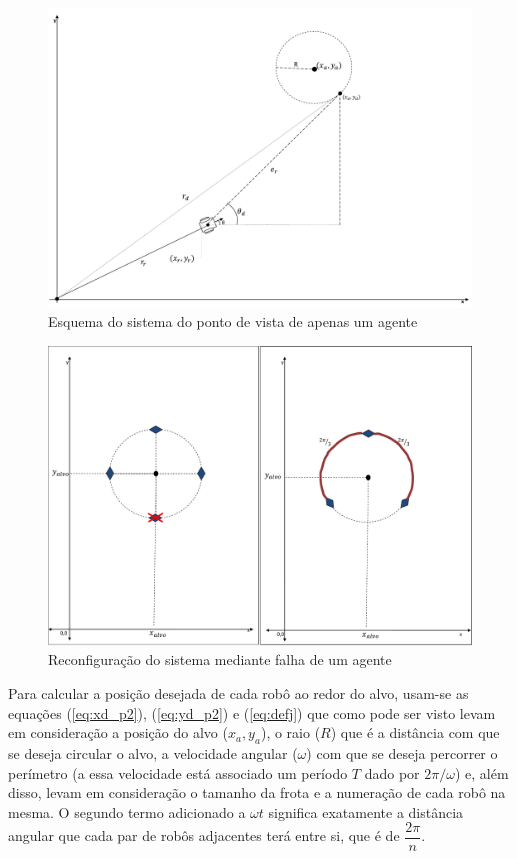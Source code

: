 \begin{figure}[!htb]
	\centering
	\includegraphics[width=1.0\textwidth]{./04-figuras/esqSistema}
	\caption{Esquema do sistema do ponto de vista de apenas um agente}
	\label{fig:esq2}
\end{figure}

\begin{figure}[!htb]
	\centering
	\includegraphics[width=1.0\textwidth]{./04-figuras/sistema}
	\caption{Reconfiguração do sistema mediante falha de um agente}
	\label{fig:sistema}
\end{figure}

Para calcular a posição desejada de cada robô ao redor do alvo, usam-se as equações (\ref{eq:xd_p2}), (\ref{eq:yd_p2}) e (\ref{eq:defj}) que como pode ser visto levam em consideração a posição do alvo ($x_{a},y_{a}$), o raio ($R$) que é a distância com que se deseja circular o alvo, a velocidade angular ($\omega$) com que se deseja percorrer o perímetro (a essa velocidade está associado um período $T$ dado por $2\pi/\omega$) e, além disso, levam em consideração o tamanho da frota e a numeração de cada robô na mesma. O segundo termo adicionado a $\omega t$ significa exatamente a distância angular que cada par de robôs adjacentes terá entre si, que é de $\dfrac{2\pi}{n}$.

